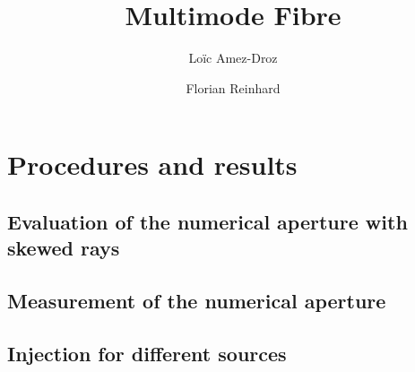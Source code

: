 \documentclass[a4paper, 12pt]{paper}
\author{Loïc Amez-Droz \and Florian Reinhard}
\title{Multimode Fibre}
\begin{document}

\section{Procedures and results}
\subsection{Evaluation of the numerical aperture with skewed rays}
\subsection{Measurement of the numerical aperture}
\subsection{Injection for different sources}
\end{document}
